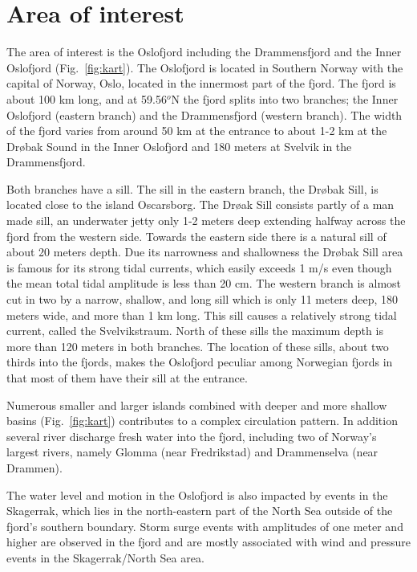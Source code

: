 \section{Area of interest}

The area of interest is the Oslofjord including the Drammensfjord and the Inner Oslofjord (Fig.~\ref{fig:kart}). The Oslofjord is located in Southern Norway with the capital of Norway, Oslo, located in the innermost part of the fjord. 
The fjord is about 100 km long, and at 59.56$^o$N the fjord splits into two branches; the Inner Oslofjord (eastern branch) and the Drammensfjord (western branch). The width of the fjord varies from around 50 km at the entrance to about 1-2 km at the Dr{\o}bak Sound in the Inner Oslofjord and 180 meters at Svelvik in the Drammensfjord.

Both branches have a sill. The sill in the eastern branch, the Dr{\o}bak Sill, is located close to the island Oscarsborg. The Dr{\o}ak Sill consists partly of a man made sill, an underwater jetty only 1-2 meters deep extending halfway across the fjord from the western side. Towards the eastern side there is a natural sill of about 20 meters depth. Due its narrowness and shallowness the Dr{\o}bak Sill area is famous for its strong tidal currents, which easily exceeds 1 m/s even though the mean total tidal amplitude is less than 20 cm. 
The western branch is almost cut in two by a narrow, shallow, and long sill which is only 11 meters deep, 180 meters wide, and more than 1 km long. This sill causes a relatively strong tidal current, called the Svelvikstraum.
North of these sills the maximum depth is more than 120 meters in both branches. 
The location of these sills, about two thirds into the fjords, makes the Oslofjord peculiar among Norwegian fjords in that most of them have their sill at the entrance.

Numerous smaller and larger islands combined with deeper and more shallow basins (Fig.~\ref{fig:kart}) contributes to a complex circulation pattern. In addition several river discharge fresh water into the fjord, including two of Norway's largest rivers, namely Glomma (near Fredrikstad) and Drammenselva (near Drammen).

The water level and motion in the Oslofjord is also impacted by events in the Skagerrak, which lies in the north-eastern part of the North Sea outside of the fjord's southern boundary. Storm surge events with amplitudes of one meter and higher are observed in the fjord and are mostly associated with wind and pressure events in the Skagerrak/North Sea area.

